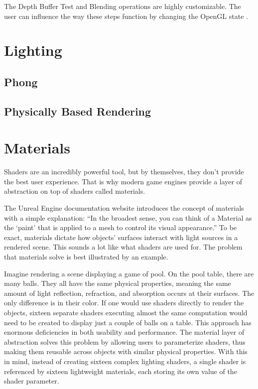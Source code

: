 \documentclass[
  digital,     %
  oneside,     %
  nosansbold,  %
  nocolorbold, %
  lof,         %
  lot,         %
]{fithesis4}
\begin{document}
The Depth Buffer Test and Blending operations are highly customizable. The user can influence the way these
steps function by changing the OpenGL state \cite[p.46]{opengl-superbible}.

\chapter{Lighting}
\section{Phong}
\section{Physically Based Rendering}

\chapter{Materials}
Shaders are an incredibly powerful tool, but by themselves, they don't provide the best user experience.
That is why modern game engines provide a layer of abstraction on top of shaders called materials.

The Unreal Engine documentation website \cite{ue-materials} introduces the concept of materials with
a simple explanation: \enquote{In the broadest sense, you can think of a Material as the \enquote{paint} that is applied to a mesh
to control its visual appearance.} To be exact, materials dictate how objects' surfaces interact with light sources
in a rendered scene. This sounds a lot like what shaders are used for. The problem that materials solve is best illustrated
by an example.

Imagine rendering a scene displaying a game of pool. On the pool table, there are many balls.
They all have the same physical properties, meaning the same amount of light reflection, refraction, and absorption occurs
at their surfaces. The only difference is in their color. If one would use shaders directly to render the objects, sixteen separate
shaders executing almost the same computation would need to be created to display just a couple of balls on a table.
This approach has enormous deficiencies in both usability and performance.
The material layer of abstraction solves this problem by allowing users to parameterize shaders,
thus making them reusable across objects with similar physical properties. With this in mind, instead of creating sixteen
complex lighting shaders, a single shader is referenced by sixteen lightweight materials, each storing its own value
of the shader parameter.
\end{document}
